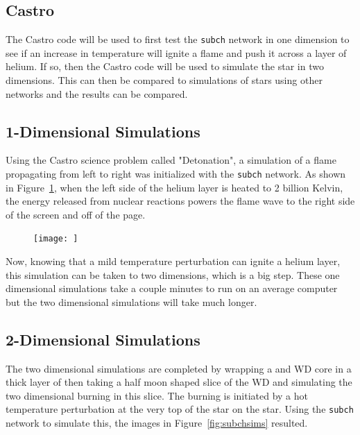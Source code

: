 \documentclass[11pt, oneside]{article}   	%
\begin{document}
  \subsection{Castro}
  
    The Castro code will be used to first test the {\tt subch} network in one dimension to see if an increase in temperature will ignite a flame and push it across a layer of helium. If so, then the Castro code will be used to simulate the star in two dimensions. This can then be compared to simulations of stars using other networks and the results can be compared. 
    
    \subsection{1-Dimensional Simulations}
    
      Using the Castro science problem called "Detonation", a simulation of a flame propagating from left to right was initialized with the {\tt subch} network. As shown in Figure~\ref{fig:detonation}, when the left side of the helium layer is heated to 2 billion Kelvin, the energy released from nuclear reactions powers the flame wave to the right side of the screen and off of the page. 
      
      \begin{figure}
        \centering
        \texttt{[image: ]}
        \caption{}
        \label{fig:detonation}
      \end{figure}
      
      Now, knowing that a mild temperature perturbation can ignite a helium layer, this simulation can be taken to two dimensions, which is a big step. These one dimensional simulations take a couple minutes to run on an average computer but the two dimensional simulations will take much longer. 
    
    \subsection{2-Dimensional Simulations}
  
      The two dimensional simulations are completed by wrapping a  and  WD core in a thick layer of  then taking a half moon shaped slice of the WD and simulating the two dimensional burning in this slice. The burning is initiated by a hot temperature perturbation at the very top of the star on the star. Using the {\tt subch} network to simulate this, the images in Figure~\ref{fig:subchsims} resulted. 
      
\end{document}
